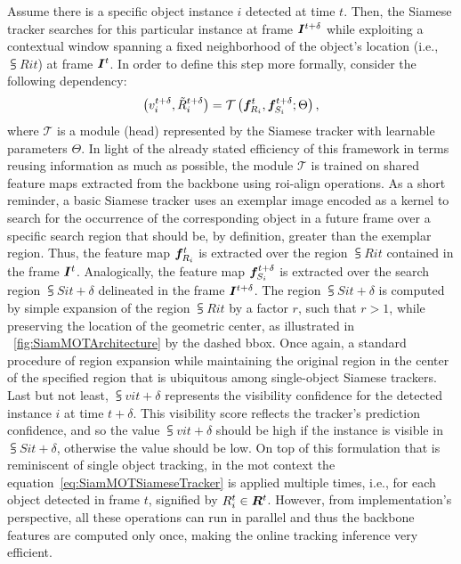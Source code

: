 Assume there is a specific object instance $i$ detected at time $t$. Then, the Siamese tracker searches for this particular instance at frame $\bm{I}^{t + \delta}$ while exploiting a contextual window spanning a fixed neighborhood of the object's location (i.e., $\subsup{R}{i}{t}$) at frame $\bm{I}^{t}$. In order to define this step more formally, consider the following dependency:
\begin{equation}
    \label{eq:SiamMOTSiameseTracker}
    \left( {
        {v}_{i}^{t + \delta},
        {\tilde{R}}_{i}^{t + \delta}
    } \right) =
    {\mathcal{T}} \left( 
        \bm{f}_{R_i}^{t}, \bm{f}_{S_i}^{t + \delta}; \Theta
     \right),
\end{equation}
where $\mathcal{T}$ is a module (head) represented by the Siamese tracker with learnable parameters $\Theta$. In light of the already stated efficiency of this framework in terms reusing information as much as possible, the module $\mathcal{T}$ is trained on shared feature maps extracted from the backbone using \gls{roi}-align operations. As a short reminder, a basic Siamese tracker uses an exemplar image encoded as a kernel to search for the occurrence of the corresponding object in a future frame over a specific search region that should be, by definition, greater than the exemplar region. Thus, the feature map $\bm{f}_{R_i}^{t}$ is extracted over the region $\subsup{R}{i}{t}$ contained in the frame $\bm{I}^{t}$. Analogically, the feature map $\bm{f}_{S_i}^{t + \delta}$ is extracted over the search region $\subsup{S}{i}{t + \delta}$ delineated in the frame $\bm{I}^{t + \delta}$. The region $\subsup{S}{i}{t + \delta}$ is computed by simple expansion of the region $\subsup{R}{i}{t}$ by a factor $r$, such that $r > 1$, while preserving the location of the geometric center, as illustrated in \figstr{}~\ref{fig:SiamMOTArchitecture} by the dashed \gls{bbox}. Once again, a standard procedure of region expansion while maintaining the original region in the center of the specified region that is ubiquitous among single-object Siamese trackers. Last but not least, $\subsup{v}{i}{t + \delta}$ represents the visibility confidence for the detected instance $i$ at time $t + \delta$. This visibility score reflects the tracker's prediction confidence, and so the value $\subsup{v}{i}{t + \delta}$ should be high if the instance is visible in $\subsup{S}{i}{t + \delta}$, otherwise the value should be low. On top of this formulation that is reminiscent of single object tracking, in the \gls{mot} context the equation~\ref{eq:SiamMOTSiameseTracker} is applied multiple times, i.e., for each object detected in frame $t$, signified by ${R}_{i}^{t} \in \bm{R}^{t}$. However, from implementation's perspective, all these operations can run in parallel and thus the backbone features are computed only once, making the online tracking inference very efficient.

